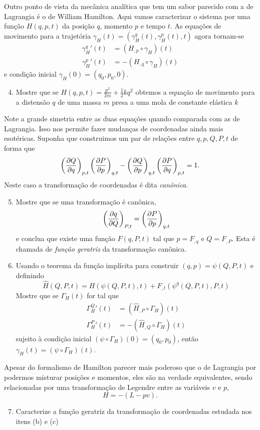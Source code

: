 \documentclass[a4paper, 12pt]{article}
\makeatletter
\newcommand\problemanswers{}
\newcommand{\answer}[1]{
    \listxadd{\problemanswers}{
        \thesection.\theenumi\ifnum\@enumdepth=2\theenumii\fi) \unexpanded{#1}
    }
}
\newcommand{\pd}[3]{
    \ifblank{#3}{}{\left(}
    \frac{\partial #1}{\partial #2}
    \ifblank{#3}{}{\right)_{#3}}
}
\theoremstyle{definition}
\theoremstyle{definition}
\makeatother
\begin{document}
\begin{enumerate}
    Outro ponto de vista da mecânica analítica que tem um sabor parecido com a de Lagrangia é o de 
    William Hamilton. Aqui vamos caracterizar o sistema por uma função $H(q,p,t)$ da posição
    $q$, momento $p$ e tempo $t$. As equações de movimento para a trajetória 
    $\gamma_H(t)=(\gamma_H^q(t),\gamma_H^p(t),t)$
    agora tornam-se
    \begin{align*}
        \gamma_H^q{'}(t)&=(H_{,p}\circ\gamma_H)(t)\\
        \gamma_H^p{'}(t)&=-(H_{,q}\circ\gamma_H)(t)
    \end{align*}
    e condição inicial $\gamma_H(0)=(q_0,p_0,0)$.
    \begin{enumerate}
        \setcounter{enumii}{3}
        \item Mostre que se $H(q,p,t)=\frac{p^2}{2m}+\frac{1}{2}kq^2$ obtemos a equação de movimento
        para a distensão $q$ de uma massa $m$ presa a uma mola de constante elástica $k$
    \end{enumerate}
    Note a grande simetria entre as duas equações quando comparada com as de Lagrangia. Isso nos permite
    fazer mudanças de coordenadas ainda mais esotéricas. Suponha que construimos um par de relações entre
    $q,p,Q,P,t$ de forma que
    $$\pd{Q}{q}{p,t}\pd{P}{p}{q,t}-\pd{Q}{p}{q,t}\pd{P}{q}{p,t}=1.$$
    Neste caso a transformação de coordenadas é dita \textit{canônica}.
    \begin{enumerate}
        \setcounter{enumii}{4}
        \item Mostre que se uma transformação é canônica,
        $$\pd{q}{Q}{P,t}=\pd{P}{p}{q,t}$$
        e conclua que existe uma função $F(q,P,t)$ tal que $p=F_{,q}$ e $Q=F_{,P}$. Esta é chamada de 
        \textit{função geratriz} da transformação canônica.
        \item Usando o teorema da função implícita para construir $(q,p)=\psi(Q,P,t)$ e definindo
        $$\hat H(Q,P,t)=H(\psi(Q,P,t),t)+F_{,t}(\psi^q(Q,P,t),P,t)$$
        Mostre que se $\Gamma_H(t)$ for tal que
        \begin{align*}
            \Gamma_H^Q{'}(t)&=(\hat H_{,P}\circ\Gamma_H)(t)\\
            \Gamma_H^P{'}(t)&=-(\hat H_{,Q}\circ\Gamma_H)(t)
        \end{align*}
        sujeito à condição inicial $(\psi\circ\Gamma_H)(0)=(q_0,p_0)$, então $\gamma_H(t)=(\psi\circ\Gamma_H)(t)$.
    \end{enumerate}
    Apesar do formalismo de Hamilton parecer mais poderoso que o de Lagrangia por podermos misturar 
    posições e momentos, eles são na verdade equivalentes, sendo relacionadas por uma transformação
    de Legendre entre as variáveis $v$ e $p$,
    $$H=-(L-pv).$$
    \begin{enumerate}
        \setcounter{enumii}{6}
        \item Caracterize a função geratriz da transformação de coordenadas estudada nos itens (b) e (c)
        \answer{$F(q,P,t)=P\varphi(q,t),\quad f(q,\varphi(q,t),t)=0$}
    \end{enumerate}
\end{enumerate}
\end{document}
